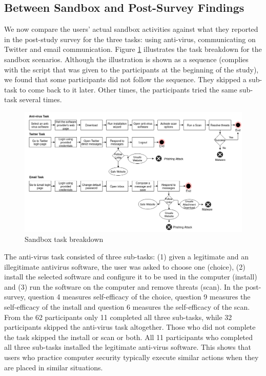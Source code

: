 \subsection{Between Sandbox and Post-Survey Findings}
We now compare the users' actual sandbox activities against what they reported in the post-study survey for the three tasks: using anti-virus, communicating on Twitter and email communication. Figure \ref{fig:tasks} illustrates the task breakdown for the sandbox scenarios. Although the illustration is shown as a sequence (complies with the script that was given to the participants at the beginning of the study), we found that some participants did not follow the sequence. They skipped a sub-task to come back to it later. Other times, the participants tried the same sub-task several times.

\begin{figure}[ht]
  \centering
\includegraphics[width=1.1\columnwidth, keepaspectratio=true]{img/tasks.png}
  \caption{Sandbox task breakdown}
  \label{fig:tasks}
\end{figure}

The anti-virus task consisted of three sub-tasks: (1) given a legitimate and an illegitimate antivirus software, the user was asked to choose one (choice), (2) install the selected software and configure it to be used in the computer (install) and (3) run the software on the computer and remove threats (scan). In the post-survey, question 4 measures self-efficacy of the choice, question 9 measures the self-efficacy of the install and question 6 measures the self-efficacy of the scan. From the 62 participants only 11 completed all three sub-tasks, while 32 participants skipped the anti-virus task altogether. Those who did not complete the task skipped the install or scan or both. All 11 participants who completed all three sub-tasks installed the legitimate anti-virus software. This shows that users who practice computer security typically execute similar actions when they are placed in similar situations.

